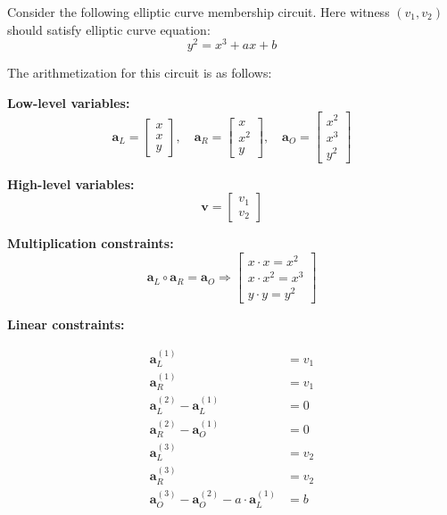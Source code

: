 \documentclass[../lecture-notes-148x210.tex]{subfiles}
\begin{document}
\begin{example}
    Consider the following elliptic curve membership circuit. Here witness $(v_1, v_2)$ should satisfy elliptic curve equation:
    \begin{equation*}
        y^2 = x^3 + ax + b
    \end{equation*}
    
    The arithmetization for this circuit is as follows:
    
    \textbf{Low-level variables:}
    \begin{equation*}
        \mathbf{a}_L = \begin{bmatrix} x \\ x \\ y \end{bmatrix}, \quad 
        \mathbf{a}_R = \begin{bmatrix} x \\ x^2 \\ y \end{bmatrix}, \quad 
        \mathbf{a}_O = \begin{bmatrix} x^2\\x^3 \\ y^2 \end{bmatrix}
    \end{equation*}
    
    \textbf{High-level variables:}
    \begin{equation*}
        \mathbf{v} = \begin{bmatrix} v_1 \\ v_2 \end{bmatrix}
    \end{equation*}
    
    \textbf{Multiplication constraints:}
    \begin{equation*}
        \mathbf{a}_L \circ \mathbf{a}_R = \mathbf{a}_O \Rightarrow \begin{bmatrix} 
            x \cdot x = x^2 \\
            x \cdot x^2 = x^3 \\ 
            y \cdot y = y^2
        \end{bmatrix}
    \end{equation*}
    
    \textbf{Linear constraints:}

    \begin{equation*}
        \begin{aligned}
            \mathbf{a}_L^{(1)} &= v_1 \\
            \mathbf{a}_R^{(1)} &= v_1 \\
            \mathbf{a}_L^{(2)} - \mathbf{a}_L^{(1)} &= 0 \\
            \mathbf{a}_R^{(2)} - \mathbf{a}_O^{(1)} &= 0 \\
            \mathbf{a}_L^{(3)} &= v_2 \\
            \mathbf{a}_R^{(3)} &= v_2 \\
            \mathbf{a}_O^{(3)} - \mathbf{a}_O^{(2)} - a \cdot \mathbf{a}_L^{(1)} &= b
        \end{aligned}
    \end{equation*}
    

\end{example}
\end{document}
